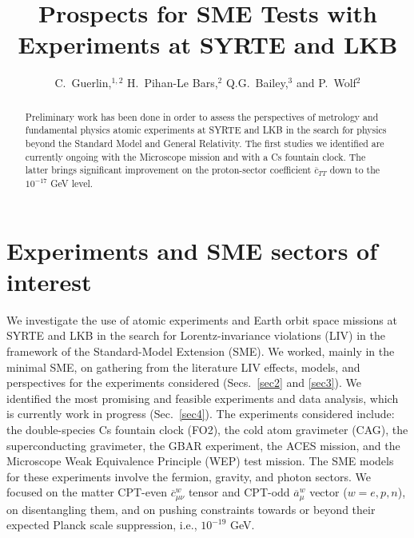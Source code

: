 \documentclass{ws-procs9x6-cpt16}
\begin{document}
\newcommand{\refeq}[1]{(\ref{#1})}
\def\etal {{\it et al.}}


\def\mbf#1{\mbox{\boldmath$#1$}}
\def\cb{\overline{c}}
\def\cbw{\cb^w}
\def\mn{{\mu\nu}}
\def\ab{\overline{a}}
\def\abw{\ab^w}
\def\sb{\overline{s}}

\title{Prospects for SME Tests with Experiments at SYRTE and LKB}

\author{C.\ Guerlin,$^{1,2}$ H.\ Pihan-Le Bars,$^{2}$ 
Q.G.\ Bailey,$^{3}$ and P.\ Wolf$^2$}

\address{$^1$Laboratoire Kastler Brossel, ENS-PSL Research University, CNRS, \\ 
UPMC-Sorbonne Universit\'es, Coll\`ege de France,
75005 Paris, France}

\address{$^2$SYRTE, Observatoire de Paris, PSL Research University, CNRS, \\ 
Sorbonne Universit\'es, UPMC, 75014 Paris, France}

\address{$^3$Embry-Riddle Aeronautical University,
Prescott, Arizona 86301, USA}

\begin{abstract}
Preliminary work has been done 
in order to assess the perspectives of metrology and fundamental physics
atomic experiments at SYRTE and LKB in the search for physics beyond
the Standard Model and General Relativity. The first
studies we identified are currently ongoing with the
Microscope mission and with a Cs
fountain clock. The latter brings significant improvement on
the proton-sector coefficient $\cb_{TT}$ down to the $10^{-17}$ GeV level.
\end{abstract}

\bodymatter

\section{Experiments and SME sectors of interest}\label{sec1}
We investigate the use of atomic experiments and Earth orbit space
missions at SYRTE and LKB in the search for Lorentz-invariance
violations (LIV) in the framework of the Standard-Model Extension (SME). 
We worked, mainly in the minimal SME, on
gathering from the literature LIV effects, models, and perspectives for
the experiments considered (Secs.\ \ref{sec2} and \ref{sec3}). We identified the most promising and feasible
experiments and data analysis, which is currently work in progress
(Sec.\ \ref{sec4}). The
experiments considered include: the double-species Cs fountain clock (FO2),
the cold atom gravimeter (CAG), the superconducting gravimeter, the GBAR
experiment,\cite{Perez2012} the ACES mission,\cite{Laurent2015}
and the Microscope Weak Equivalence Principle (WEP) test mission.\cite{Touboul2002}
The SME models for these
experiments involve the fermion, gravity, and photon
sectors. We focused on the matter CPT-even $\cbw_\mn$ tensor
and CPT-odd $\abw_\mu$ vector
($w=e,p,n$), on disentangling them, and on pushing constraints towards or beyond their expected Planck scale
suppression, i.e., $10^{-19}$ GeV.
\end{document}
